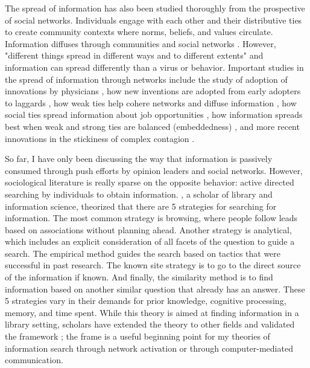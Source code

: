 The spread of information has also been studied thoroughly from the
prospective of social networks. Individuals engage with each other and
their distributive ties to create community contexts where norms,
beliefs, and values circulate. Information diffuses through communities
and social networks \citep{fowler2010cooperative, bond_etal12, klarEffectNetworkStructure2017}.
However, "different things spread in different ways and to
different extents" \citep[p. 563]{christakisSocialContagionTheory2013} and information can
spread differently than a virus or behavior. Important studies in the
spread of information through networks include the study of adoption of
innovations by physicians \citep{colemanDiffusionInnovationPhysicians1957}, how new
inventions are adopted from early adopters to laggards \citep{rogersDiffusionInnovations1962},
how weak ties help cohere networks and diffuse information
\citep{granovetterStrengthWeakTies1973}, how social ties spread information about job
opportunities \citep{granovetterGettingJobStudy1995, montgomeryJobSearchNetwork1992}, how information
spreads best when weak and strong ties are balanced (embeddedness) \citep{uzziSocialStructureCompetition1997}, and more recent innovations in the stickiness of complex contagion \citep{centolaComplexContagionsWeakness2007}.

So far, I have only been discussing the way that information is
passively consumed through push efforts by opinion leaders and social
networks. However, sociological literature is really sparse on the
opposite behavior: active directed searching by individuals to obtain
information. \citep{pejtersenDesignComputeraidedUsersystem1984}, a scholar of library and information
science, theorized that there are 5 strategies for searching for
information. The most common strategy is browsing, where people follow
leads based on associations without planning ahead. Another strategy is
analytical, which includes an explicit consideration of all facets of
the question to guide a search. The empirical method guides the search
based on tactics that were successful in past research. The known site
strategy is to go to the direct source of the information if known. And
finally, the similarity method is to find information based on another
similar question that already has an answer. These 5 strategies vary in
their demands for prior knowledge, cognitive processing, memory, and
time spent. While this theory is aimed at finding information in a
library setting, scholars have extended the theory to other fields and
validated the framework \citep{fidelHumanInformationInteraction2012}; the frame is a useful beginning
point for my theories of information search through network activation
or through computer-mediated communication.

